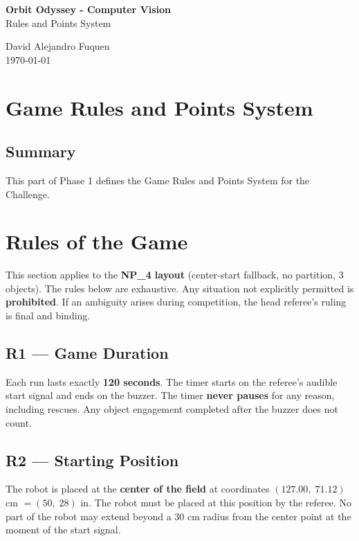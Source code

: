 \documentclass[a4]{article}
\begin{document}
\thispagestyle{fancy}

\begin{center}
    \textbf{\large Orbit Odyssey - Computer Vision} \\
    {Rules and Points System}
    
    \vspace{0.7em}

    David Alejandro Fuquen \\

    {\small \today}

\end{center}

\section*{Game Rules and Points System}

\subsection*{Summary}
This part of Phase 1 defines the Game Rules and Points System for the Challenge. 

\section*{Rules of the Game}
This section applies to the \textbf{NP\_4 layout} (center-start fallback, no partition, 3 objects). The rules below are exhaustive. Any situation not explicitly permitted is \textbf{prohibited}. If an ambiguity arises during competition, the head referee's ruling is final and binding.

\subsection*{R1 --- Game Duration}
Each run lasts exactly \textbf{120 seconds}. The timer starts on the referee's audible start signal and ends on the buzzer. The timer \textbf{never pauses} for any reason, including rescues. Any object engagement completed after the buzzer does not count.

\subsection*{R2 --- Starting Position}
The robot is placed at the \textbf{center of the field} at coordinates $(127.00,\; 71.12)$ cm $= (50,\; 28)$ in. The robot must be placed at this position by the referee. No part of the robot may extend beyond a 30 cm radius from the center point at the moment of the start signal.
\end{document}
